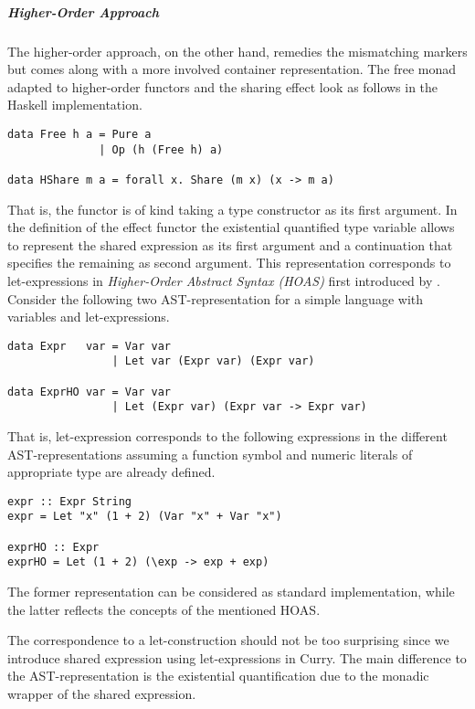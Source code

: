 \subparagraph{Higher-Order Approach}
The higher-order approach, on the other hand, remedies the mismatching
markers but comes along with a more involved container representation.
The free monad adapted to higher-order functors and the sharing effect
look as follows in the Haskell implementation.

\begin{verbatim}
data Free h a = Pure a
              | Op (h (Free h) a)  

data HShare m a = forall x. Share (m x) (x -> m a)
\end{verbatim}

That is, the functor  is of kind \hinl{(* -> *) -> * -> *}
taking a type constructor as its first argument.
In the definition of the effect functor  the existential
quantified type variable   allows to represent the shared
expression as its first argument  and a continuation  that specifies the remaining as second argument.
This representation corresponds to let-expressions in
\emph{Higher-Order Abstract Syntax (HOAS)} first introduced by
\citet{pfenning1988higher}.
Consider the following two AST-representation for a simple language
with variables and let-expressions.

\begin{verbatim}
data Expr   var = Var var
                | Let var (Expr var) (Expr var)

data ExprHO var = Var var
                | Let (Expr var) (Expr var -> Expr var)
\end{verbatim}

That is, let-expression 
corresponds to the following expressions in the different
AST-representations assuming a function symbol \hinl{+} and numeric
literals of appropriate type are already defined.

\begin{verbatim}
expr :: Expr String
expr = Let "x" (1 + 2) (Var "x" + Var "x")

exprHO :: Expr
exprHO = Let (1 + 2) (\exp -> exp + exp)
\end{verbatim}

The former representation can be considered as standard
implementation, while the latter reflects the concepts of the
mentioned HOAS.

The correspondence to a let-construction should not be too surprising
since we introduce shared expression using let-expressions in Curry.
The main difference to the AST-representation is the existential
quantification due to the monadic wrapper of the shared expression.

